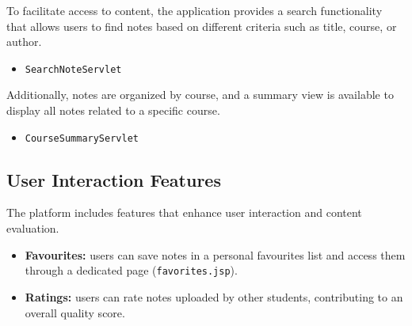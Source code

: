 To facilitate access to content, the application provides a search functionality
that allows users to find notes based on different criteria such as title,
course, or author.

\begin{itemize}
    \item \texttt{SearchNoteServlet}
\end{itemize}

Additionally, notes are organized by course, and a summary view is available
to display all notes related to a specific course.

\begin{itemize}
    \item \texttt{CourseSummaryServlet}
\end{itemize}

\subsection{User Interaction Features}

The platform includes features that enhance user interaction and content evaluation.

\begin{itemize}
    \item \textbf{Favourites:} users can save notes in a personal favourites list
    and access them through a dedicated page (\texttt{favorites.jsp}).

    \item \textbf{Ratings:} users can rate notes uploaded by other students,
    contributing to an overall quality score.
\end{itemize}
